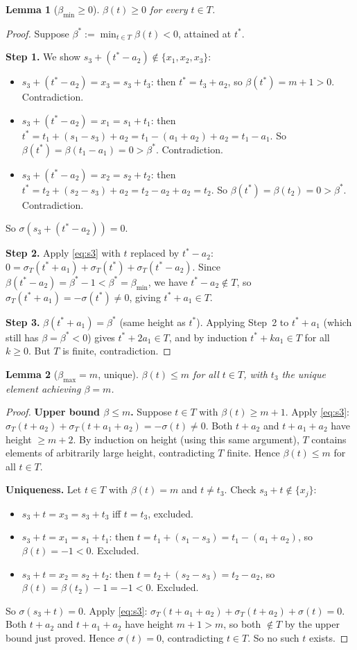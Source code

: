 \documentclass{article}
\newtheorem{lemma}{Lemma}
\begin{document}
\begin{lemma}[$\beta_{\min}\ge 0$]\label{lem:betamin}
$\beta(t)\ge 0$ for every $t\in T$.
\end{lemma}
\begin{proof}
Suppose $\beta^*:=\min_{t\in T}\beta(t)<0$, attained at $t^*$.

\textbf{Step 1.} We show $s_3+(t^*-a_2)\notin\{x_1,x_2,x_3\}$:
\begin{itemize}
\item $s_3+(t^*-a_2)=x_3=s_3+t_3$: then $t^*=t_3+a_2$, so $\beta(t^*)=m+1>0$. Contradiction.
\item $s_3+(t^*-a_2)=x_1=s_1+t_1$: then $t^*=t_1+(s_1-s_3)+a_2=t_1-(a_1+a_2)+a_2=t_1-a_1$.
      So $\beta(t^*)=\beta(t_1-a_1)=0>\beta^*$. Contradiction.
\item $s_3+(t^*-a_2)=x_2=s_2+t_2$: then $t^*=t_2+(s_2-s_3)+a_2=t_2-a_2+a_2=t_2$.
      So $\beta(t^*)=\beta(t_2)=0>\beta^*$. Contradiction.
\end{itemize}
So $\sigma(s_3+(t^*-a_2))=0$.

\textbf{Step 2.} Apply \eqref{eq:s3} with $t$ replaced by $t^*-a_2$:
$0=\sigma_T(t^*+a_1)+\sigma_T(t^*)+\sigma_T(t^*-a_2)$.
Since $\beta(t^*-a_2)=\beta^*-1<\beta^*=\beta_{\min}$, we have $t^*-a_2\notin T$, so
$\sigma_T(t^*+a_1)=-\sigma(t^*)\ne 0$, giving $t^*+a_1\in T$.

\textbf{Step 3.} $\beta(t^*+a_1)=\beta^*$ (same height as $t^*$).
Applying Step~2 to $t^*+a_1$ (which still has $\beta=\beta^*<0$) gives
$t^*+2a_1\in T$, and by induction $t^*+ka_1\in T$ for all $k\ge 0$.
But $T$ is finite, contradiction.
\end{proof}

\begin{lemma}[$\beta_{\max}=m$, unique]\label{lem:betamax}
$\beta(t)\le m$ for all $t\in T$, with $t_3$ the unique element achieving $\beta=m$.
\end{lemma}
\begin{proof}
\textbf{Upper bound $\beta\le m$.}
Suppose $t\in T$ with $\beta(t)\ge m+1$.
Apply \eqref{eq:s3}: $\sigma_T(t+a_2)+\sigma_T(t+a_1+a_2)=-\sigma(t)\ne 0$.
Both $t+a_2$ and $t+a_1+a_2$ have height $\ge m+2$.
By induction on height (using this same argument), $T$ contains elements of
arbitrarily large height, contradicting $T$ finite.
Hence $\beta(t)\le m$ for all $t\in T$.

\textbf{Uniqueness.}
Let $t\in T$ with $\beta(t)=m$ and $t\ne t_3$.
Check $s_3+t\notin\{x_j\}$:
\begin{itemize}
\item $s_3+t=x_3=s_3+t_3$ iff $t=t_3$, excluded.
\item $s_3+t=x_1=s_1+t_1$: then $t=t_1+(s_1-s_3)=t_1-(a_1+a_2)$, so $\beta(t)=-1<0$. Excluded.
\item $s_3+t=x_2=s_2+t_2$: then $t=t_2+(s_2-s_3)=t_2-a_2$, so $\beta(t)=\beta(t_2)-1=-1<0$. Excluded.
\end{itemize}
So $\sigma(s_3+t)=0$. Apply \eqref{eq:s3}:
$\sigma_T(t+a_1+a_2)+\sigma_T(t+a_2)+\sigma(t)=0$.
Both $t+a_2$ and $t+a_1+a_2$ have height $m+1>m$, so both $\notin T$
by the upper bound just proved.
Hence $\sigma(t)=0$, contradicting $t\in T$.  So no such $t$ exists.
\end{proof}
\end{document}
